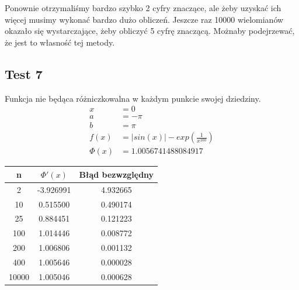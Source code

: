 \documentclass[a4paper]{article}
\begin{document}
   Ponownie otrzymaliśmy bardzo szybko 2 cyfry znaczące, ale żeby uzyskać ich więcej musimy wykonać bardzo dużo obliczeń.
   Jeszcze raz 10000 wielomianów okazało się wystarczające, żeby obliczyć 5 cyfrę znaczącą. Możnaby podejrzewać, że jest to
   własność tej metody.

\newpage
\subsection{Test 7}
    Funkcja nie będąca różniczkowalna w każdym punkcie swojej dziedziny.
    \[
        \begin{aligned}
            x &= 0 \\
            a & = -\pi \\
            b &= \pi \\
            f(x) &= |sin(x)| - exp(\frac{1}{x^{100}}) \\
            \Phi(x) &= 1.0056741488084917
        \end{aligned}
    \]

    \begin{center}
        \begin{tabular}{|c|c|c|} 
            \hline
            n & $\Phi'(x)$ & Błąd bezwzględny \\
            \hline
            2 & -3.926991 & 4.932665 \\
            \hline
            10 & 0.515500 & 0.490174 \\
            \hline
            25 & 0.884451 & 0.121223 \\
            \hline
            100 & 1.014446 & 0.008772 \\
            \hline
            200 & 1.006806 & 0.001132 \\
            \hline
            400 & 1.005646 & 0.000028 \\
            \hline
            10000 & 1.005046 & 0.000628 \\
            \hline
        \end{tabular}
    \end{center}
\end{document}
